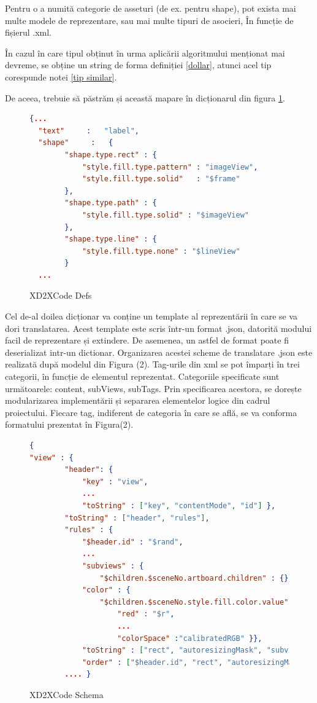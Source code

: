 \begin{myNote}\label{tip similar}

Pentru o a numită categorie de asseturi (de ex. pentru shape), pot exista mai multe modele de reprezentare, sau mai multe tipuri de asocieri, În funcție de fișierul .xml.
\end{myNote}

În cazul în care tipul obținut în urma aplicării algoritmului menționat mai devreme, se obține un string de forma definiției \ref{dollar}, atunci acel tip corespunde notei \ref{tip similar}.

De aceea, trebuie să păstrăm și această mapare în dicționarul din figura \ref{fig:XD2XCode Defs}.


\begin{figure}
\begin{lstlisting}[language=json,firstnumber=1]
  {...
  "text"     :   "label",
  "shape"     :   {
        "shape.type.rect" : {
            "style.fill.type.pattern" : "imageView",
            "style.fill.type.solid"   : "$frame"
        },
        "shape.type.path" : {
            "style.fill.type.solid" : "$imageView"
        },
        "shape.type.line" : {
            "style.fill.type.none" : "$lineView"
        }
  ...
\end{lstlisting}
\caption{XD2XCode Defs} \label{fig:XD2XCode Defs}
\end{figure}


Cel de-al doilea dicționar va conține un template al reprezentării în care se va dori translatarea. Acest template este scris într-un format .json, datorită modului facil de reprezentare și extindere. De asemenea, un astfel de format poate fi deserializat intr-un dictionar. Organizarea acestei scheme de translatare .json este realizată după modelul din Figura (2). Tag-urile din xml se pot împarți în trei categorii, în funcție de elementul reprezentat. Categoriile specificate sunt următoarele: content, subViews, subTags. Prin specificarea acestora, se dorește modularizarea implementării și separarea elementelor logice din cadrul proiectului. Fiecare tag, indiferent de categoria în care se află, se va conforma formatului prezentat în Figura(2).  

\begin{figure}
\begin{lstlisting}[language=json,firstnumber=1]
{
"view" : {
        "header": {
            "key" : "view",
            ...
            "toString" : ["key", "contentMode", "id"] },
        "toString" : ["header", "rules"],
        "rules" : { 
            "$header.id" : "$rand",
            ...
            "subviews" : {
                "$children.$sceneNo.artboard.children" : {}},
            "color" : {
                "$children.$sceneNo.style.fill.color.value" : {
                    "red" : "$r",
                    ...
                    "colorSpace" :"calibratedRGB" }},
            "toString" : ["rect", "autoresizingMask", "subviews", "color"],
            "order" : ["$header.id", "rect", "autoresizingMask", "color", "subviews"] }
        .... }
\end{lstlisting}
\caption{XD2XCode Schema} \label{fig:XD2XCode Schema}
\end{figure}

